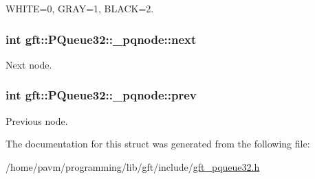 W\-H\-I\-T\-E=0, G\-R\-A\-Y=1, B\-L\-A\-C\-K=2. 

\hypertarget{structgft_1_1PQueue32_1_1__pqnode_a044ff40f8cd925b0269ebada823fbc0c}{
\subsubsection[{next}]{\setlength{\rightskip}{0pt plus 5cm}int gft\-::\-P\-Queue32\-::\-\_\-pqnode\-::next}}\label{structgft_1_1PQueue32_1_1__pqnode_a044ff40f8cd925b0269ebada823fbc0c}


Next node. 

\hypertarget{structgft_1_1PQueue32_1_1__pqnode_a2a10c5ab969878d64e00c1a272c55a42}{
\subsubsection[{prev}]{\setlength{\rightskip}{0pt plus 5cm}int gft\-::\-P\-Queue32\-::\-\_\-pqnode\-::prev}}\label{structgft_1_1PQueue32_1_1__pqnode_a2a10c5ab969878d64e00c1a272c55a42}


Previous node. 



The documentation for this struct was generated from the following file\-:\begin{DoxyCompactItemize}
\item 
/home/pavm/programming/lib/gft/include/\hyperlink{gft__pqueue32_8h}{gft\-\_\-pqueue32.\-h}\end{DoxyCompactItemize}
